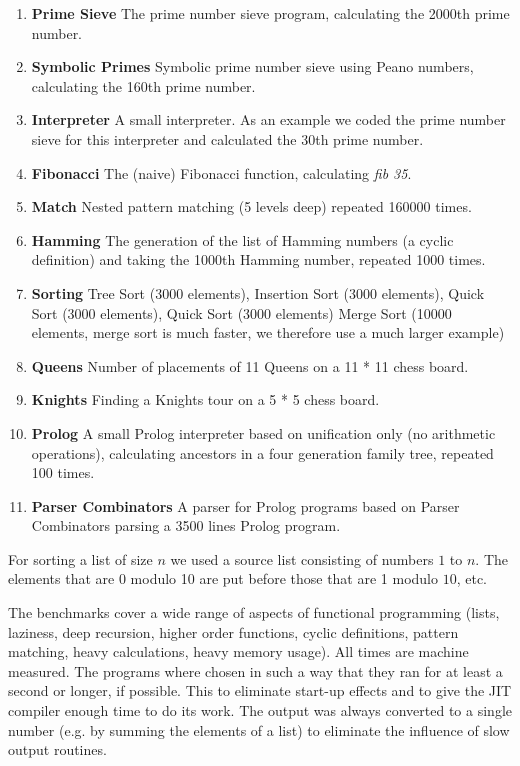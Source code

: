 \begin{enumerate}
\item {\bf Prime Sieve} The prime number sieve program, calculating the 2000th
prime number.
\item {\bf Symbolic Primes} Symbolic prime number sieve using Peano numbers,
calculating the 160th prime number.
\item {\bf Interpreter} A small \Sapl  interpreter. As an example we coded the prime
number sieve for this interpreter and calculated the 30th prime number.
\item {\bf Fibonacci} The (naive) Fibonacci function, calculating {\em fib 35}.
\item {\bf Match} Nested pattern matching (5 levels deep) repeated 160000 times.
\item {\bf Hamming} The generation of the list of Hamming numbers (a cyclic
definition) and taking the 1000th Hamming number, repeated 1000 times.
\item {\bf Sorting} Tree Sort (3000 elements), Insertion Sort (3000 elements), Quick Sort (3000 elements), Quick Sort (3000 elements) Merge
Sort (10000 elements, merge sort is much faster, we therefore use a much larger example)
\item {\bf Queens} Number of placements of 11 Queens on a 11 * 11 chess board.
\item {\bf Knights} Finding a Knights tour on a 5 * 5 chess board.
\item {\bf Prolog} A small Prolog interpreter based on unification only (no
arithmetic operations), calculating ancestors in a four generation family tree,
repeated 100 times.
\item {\bf Parser Combinators} A parser for Prolog programs based on Parser
Combinators parsing a 3500 lines Prolog program.
\end{enumerate}
%
For sorting a list of size $n$ we used a source list consisting of numbers $1$
to $n$. The elements that are 0 modulo 10 are put before those that are 1 modulo
$10$, etc.

The benchmarks cover a wide range of aspects of functional programming (lists, laziness, 
deep recursion, higher order functions, cyclic definitions, pattern matching, 
heavy calculations, heavy memory usage).
All times are machine measured. The programs where chosen in such a way that
they ran for at least a second or longer, if possible. This to eliminate start-up 
effects and to give the JIT compiler enough time to do its work. 
The output was always converted to a single number (e.g. 
by summing the elements of a list) to eliminate the influence of slow output 
routines.

